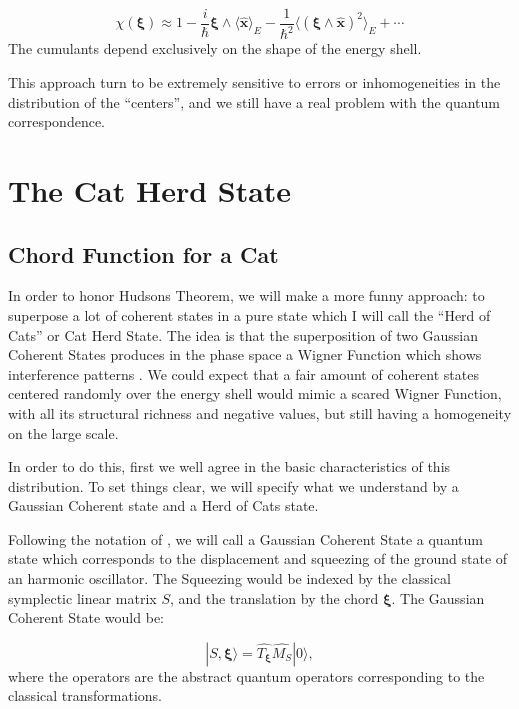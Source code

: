 \documentclass[a4paper,12pt]{article}
\newcommand{\ihb}{\frac{i}{\hbar}}
\newcommand{\xfase}{\mathbf{x}}
\newcommand{\xifase}{ {\boldsymbol{\xi}} }
\newcommand{\ket}[1]{|#1\rangle}
\newcommand{\Prom}[2]{\langle #1\rangle_{#2}}
\begin{document}
\begin{equation}
\chi(\xifase)\approx 
1-\ihb \xifase \wedge \Prom{\hat{\xfase}}{E}
-\frac{1}{\hbar^2}
\Prom{(\xifase\wedge \hat{\xfase})^2}{E}+\cdots
\end{equation}
The cumulants depend exclusively on the shape of the energy
shell. 

This approach turn to be extremely sensitive to
errors or inhomogeneities in the 
distribution of the ``centers'', and we still have 
a real problem with the quantum correspondence.

\section{The Cat Herd State}

\subsection{Chord Function for a Cat}

In order to honor Hudsons Theorem, we will make a more
funny approach: to superpose a lot of coherent states
in a pure state which I will call the ``Herd of Cats'' or
Cat Herd State. The idea is that the superposition of two
Gaussian Coherent States produces in the 
phase space a Wigner Function which shows interference
patterns \cite{Vallejos10}. We could expect that a 
fair amount of coherent states centered randomly over
the energy shell would mimic a scared Wigner Function,
with all its structural richness and negative values,
but still having a homogeneity on the large scale.

In order to do this, first we well agree in the basic
characteristics of this distribution. To set things clear,
we will specify what we understand by a Gaussian Coherent
state and a Herd of Cats state.   

Following the notation of \cite{Vallejos10}, we will
call a Gaussian Coherent State a quantum state which
corresponds to the displacement and squeezing of 
the ground state of an harmonic oscillator. The
Squeezing would be indexed by the classical symplectic
linear matrix $S$, and the translation by the 
chord $\xifase$.  The Gaussian Coherent State would be:

\begin{equation}
\ket{S,\xifase}=\hat{T_\xifase}\hat{M_S}\ket{0},
\end{equation}
where the operators are the abstract quantum
operators corresponding to the classical transformations.
\end{document}
